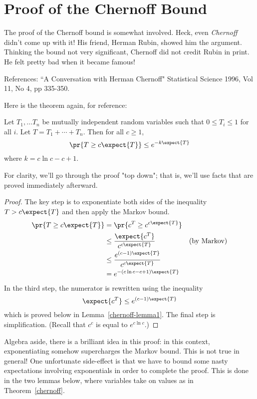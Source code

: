 \section{Proof of the Chernoff Bound}

The proof of the Chernoff bound is somewhat involved.  Heck, even {\em
  Chernoff} didn't come up with it!  His friend, Herman Rubin, showed
him the argument.  Thinking the bound not very significant, Chernoff
did not credit Rubin in print.  He felt pretty bad when it became
famous!
\begin{editingnotes}
 References: ``A Conversation with Herman Chernoff" Statistical
 Science 1996, Vol 11, No 4, pp 335-350.

Here is the theorem again, for reference:

\begin{theorem}
Let $T_1, \dots T_n$ be mutually independent random variables such
that $0 \leq T_i \leq 1$ for all $i$.  Let $T = T_1 + \cdots + T_n$.
Then for all $c \geq 1$,
\[
\pr{T \geq c \expect{T}} \leq e^{- k \expect{T}}
\]
where $k = c \ln c - c + 1$.
\end{theorem}
\end{editingnotes}

For clarity, we'll go through the proof "top down"; that is, we'll use
facts that are proved immediately afterward.

\begin{proof} The key step is to exponentiate both sides of the
  inequality $T > c \expect{T}$ and then apply the Markov bound.
\begin{align*}
\pr{T \geq c \expect{T}} & = \pr{c^T \geq c^{c \expect{T}}} \\
  & \leq \frac{\expect{c^T}}{c^{c \expect{T}}} & \text{(by Markov)}\\
  & \leq \frac{e^{(c-1) \expect{T}}}{c^{c \expect{T}}} \\
  & = e^{- (c \ln c - c + 1) \expect{T}}
\end{align*}
In the third step, the numerator is rewritten using the inequality
\[
\expect{c^T} \leq e^{(c-1) \expect{T}}
\]
which is proved below in Lemma~\ref{chernoff-lemma1}.  The final step
is simplification.  (Recall that $c^c$ is equal to $e ^{c \ln c}$.)
\end{proof}

Algebra aside, there is a brilliant idea in this proof: in this
context, exponentiating somehow supercharges the Markov bound.  This
is not true in general!  One unfortunate side-effect is that we have
to bound some nasty expectations involving exponentials in order to
complete the proof.  This is done in the two lemmas below, where
variables take on values as in Theorem~\ref{chernoff}.

